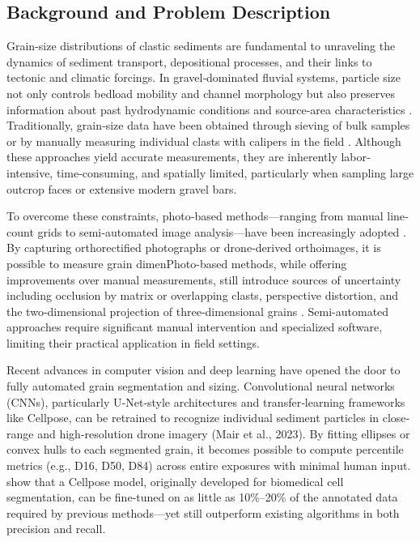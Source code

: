 \documentclass[project-plan]{report-template}
\begin{document}
\subsection{Background and Problem Description}
Grain-size distributions of clastic sediments are fundamental to unraveling the dynamics of sediment transport, depositional processes, and their links to tectonic and climatic forcings. In gravel‐dominated fluvial systems, particle size not only controls bedload mobility and channel morphology but also preserves information about past hydrodynamic conditions and source-area characteristics \citep{Church2006}. Traditionally, grain‐size data have been obtained through sieving of bulk samples or by manually measuring individual clasts with calipers in the field \citep{Bunte2001}. Although these approaches yield accurate measurements, they are inherently labor‐intensive, time‐consuming, and spatially limited, particularly when sampling large outcrop faces or extensive modern gravel bars.

To overcome these constraints, photo‐based methods—ranging from manual line‐count grids to semi‐automated image analysis—have been increasingly adopted \citep{Graham2010, Purinton2019}. By capturing orthorectified photographs or drone‐derived orthoimages, it is possible to measure grain dimenPhoto-based methods, while offering improvements over manual measurements, still introduce sources of uncertainty including occlusion by matrix or overlapping clasts, perspective distortion, and the two-dimensional projection of three-dimensional grains \citep{Garefalakis2023}. Semi-automated approaches require significant manual intervention and specialized software, limiting their practical application in field settings.

Recent advances in computer vision and deep learning have opened the door to fully automated grain segmentation and sizing. Convolutional neural networks (CNNs), particularly U‐Net‐style architectures and transfer‐learning frameworks like Cellpose, can be retrained to recognize individual sediment particles in close‐range and high‐resolution drone imagery (Mair et al., 2023). By fitting ellipses or convex hulls to each segmented grain, it becomes possible to compute percentile metrics (e.g., D16, D50, D84) across entire exposures with minimal human input. \cite{Mair2023} show that a Cellpose model, originally developed for biomedical cell segmentation, can be fine‐tuned on as little as 10\%–20\% of the annotated data required by previous methods—yet still outperform existing algorithms in both precision and recall.
\end{document}
